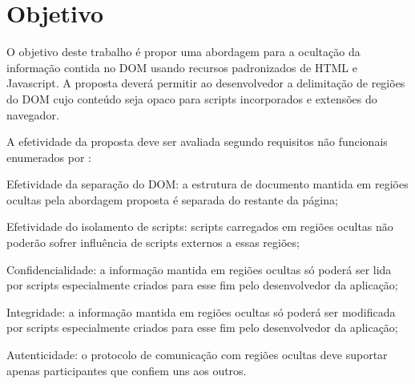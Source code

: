 \section{Objetivo}



O objetivo deste trabalho é propor uma abordagem para a ocultação da informação contida no DOM usando recursos padronizados de HTML e Javascript. A proposta deverá permitir ao desenvolvedor a delimitação de regiões do DOM cujo conteúdo seja opaco para scripts incorporados e extensões do navegador.

A efetividade da proposta deve ser avaliada segundo requisitos não funcionais enumerados por \cite{DeRyck2012}:

\begin{alineas}
	\item Efetividade da separação do DOM: a estrutura de documento mantida em regiões ocultas pela abordagem proposta é separada do restante da página;
	\item Efetividade do isolamento de scripts: scripts carregados em regiões ocultas não poderão sofrer influência de scripts externos a essas regiões;
	\item Confidencialidade: a informação mantida em regiões ocultas só poderá ser lida por scripts especialmente criados para esse fim pelo desenvolvedor da aplicação;
	\item Integridade: a informação mantida em regiões ocultas só poderá ser modificada por scripts especialmente criados para esse fim pelo desenvolvedor da aplicação;
	\item Autenticidade: o protocolo de comunicação com regiões ocultas deve suportar apenas participantes que confiem uns aos outros.
\end{alineas}

